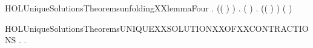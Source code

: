 \begin{SaveVerbatim}{HOLUniqueSolutionsTheoremsunfoldingXXlemmaFour}
\HOLTokenTurnstile{} \HOLSymConst{\HOLTokenForall{}}     .
         \HOLSymConst{\HOLTokenConj{}}   \HOLSymConst{\HOLTokenConj{}}  (( \HOLConst{\HOLTokenCompose}   ) )   \HOLSymConst{\HOLTokenConj{}}
         \HOLSymConst{\HOLTokenLeq{}}  \HOLSymConst{\HOLTokenImp{}}
       \HOLSymConst{\HOLTokenExists{}}.
             \HOLSymConst{\HOLTokenConj{}} ( \HOLSymConst{=}  ) \HOLSymConst{\HOLTokenConj{}}
           \HOLSymConst{\HOLTokenForall{}}.  (( \HOLConst{\HOLTokenCompose}   ) )  ( )
\end{SaveVerbatim}
\newcommand{\HOLUniqueSolutionsTheoremsunfoldingXXlemmaFour}{\UseVerbatim{HOLUniqueSolutionsTheoremsunfoldingXXlemmaFour}}
\begin{SaveVerbatim}{HOLUniqueSolutionsTheoremsUNIQUEXXSOLUTIONXXOFXXCONTRACTIONS}
\HOLTokenTurnstile{} \HOLSymConst{\HOLTokenForall{}}.
         \HOLSymConst{\HOLTokenImp{}}
       \HOLSymConst{\HOLTokenForall{}} .     \HOLSymConst{\HOLTokenConj{}}     \HOLSymConst{\HOLTokenImp{}}   
\end{SaveVerbatim}
\newcommand{\HOLUniqueSolutionsTheoremsUNIQUEXXSOLUTIONXXOFXXCONTRACTIONS}{\UseVerbatim{HOLUniqueSolutionsTheoremsUNIQUEXXSOLUTIONXXOFXXCONTRACTIONS}}
